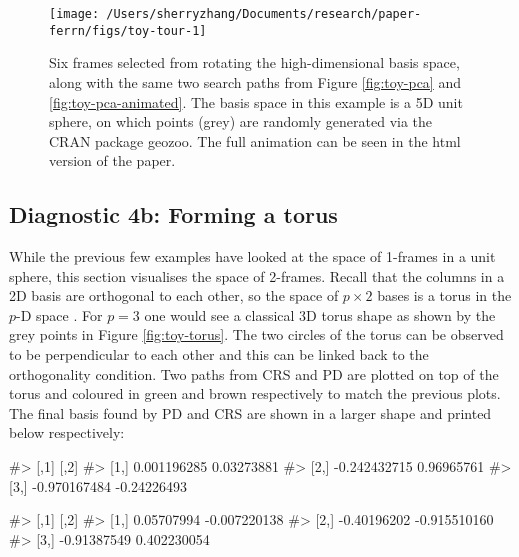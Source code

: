 \begin{Schunk}
\begin{figure}

{\centering \texttt{[image: /Users/sherryzhang/Documents/research/paper-ferrn/figs/toy-tour-1]} 

}

\caption{Six frames selected from rotating the high-dimensional basis space, along with the same two search paths from Figure \ref{fig:toy-pca} and \ref{fig:toy-pca-animated}. The basis space in this example is a 5D unit sphere, on which points (grey) are randomly generated via the CRAN package geozoo. The full animation can be seen in the html version of the paper.}\label{fig:toy-tour}
\end{figure}
\end{Schunk}

\hypertarget{diagnostic-4b-forming-a-torus}{%
\subsection{Diagnostic 4b: Forming a
torus}\label{diagnostic-4b-forming-a-torus}}

While the previous few examples have looked at the space of 1-frames in
a unit sphere, this section visualises the space of 2-frames. Recall
that the columns in a 2D basis are orthogonal to each other, so the
space of \(p \times 2\) bases is a torus in the \(p\)-D space
\citep{Buja1986-sw}. For \(p = 3\) one would see a classical 3D torus
shape as shown by the grey points in Figure \ref{fig:toy-torus}. The two
circles of the torus can be observed to be perpendicular to each other
and this can be linked back to the orthogonality condition. Two paths
from CRS and PD are plotted on top of the torus and coloured in green
and brown respectively to match the previous plots. The final basis
found by PD and CRS are shown in a larger shape and printed below
respectively:

\begin{Schunk}
\begin{Soutput}
#>              [,1]        [,2]
#> [1,]  0.001196285  0.03273881
#> [2,] -0.242432715  0.96965761
#> [3,] -0.970167484 -0.24226493
\end{Soutput}
\end{Schunk}

\begin{Schunk}
\begin{Soutput}
#>             [,1]         [,2]
#> [1,]  0.05707994 -0.007220138
#> [2,] -0.40196202 -0.915510160
#> [3,] -0.91387549  0.402230054
\end{Soutput}
\end{Schunk}

